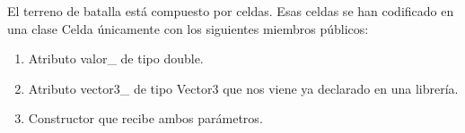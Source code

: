 El terreno de batalla está compuesto por celdas.
Esas celdas se han codificado en una clase Celda únicamente con los siguientes miembros públicos:
{\begin{enumerate}
    \item Atributo valor\_ de tipo double.
    \item Atributo vector3\_ de tipo Vector3 que nos viene ya declarado en una librería.
    \item Constructor que recibe ambos parámetros.
\end{enumerate}}